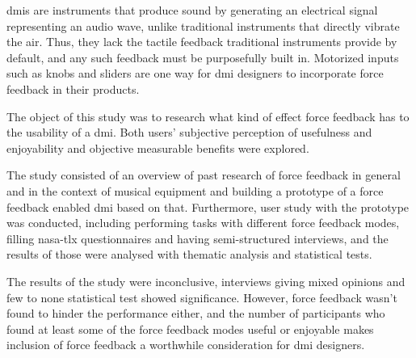 \glspl{dmi} are instruments that produce sound by generating an electrical signal representing an audio wave, unlike traditional instruments that directly vibrate the air. Thus, they lack the tactile feedback traditional instruments provide by default, and any such feedback must be purposefully built in. Motorized inputs such as knobs and sliders are one way for \gls{dmi} designers to incorporate force feedback in their products.

The object of this study was to research what kind of effect force feedback has to the usability of a \gls{dmi}. Both users' subjective perception of usefulness and enjoyability and objective measurable benefits were explored.

The study consisted of an overview of past research of force feedback in general and in the context of musical equipment and building a prototype of a force feedback enabled \gls{dmi} based on that. Furthermore, user study with the prototype was conducted, including performing tasks  with different force feedback modes, filling \gls{nasa-tlx} questionnaires and having semi-structured interviews, and the results of those were analysed with thematic analysis and statistical tests.

The results of the study were inconclusive, interviews giving mixed opinions and few to none statistical test showed significance. However, force feedback wasn't found to hinder the performance either, and the number of participants who found at least some of the force feedback modes useful or enjoyable makes inclusion of force feedback a worthwhile consideration for \gls{dmi} designers.